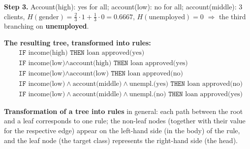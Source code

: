 \documentclass[11pt,a4paper]{article}
\theoremstyle{definition}
\begin{document}
\begin{defbox}
\textbf{Step 3.} Account(high): yes for all; account(low): no for all; account(middle): 3
clients, $H(\text{gender})=\tfrac23\cdot 1+\tfrac13\cdot 0=0.6667$,
$H(\text{unemployed})=0$ $\Rightarrow$ the third branching on \textbf{unemployed}.

\textbf{The resulting tree, transformed into rules:}
\begin{align*}
&\texttt{IF } \text{income(high)} \texttt{ THEN } \text{loan approved(yes)}\\
&\texttt{IF } \text{income(low)}\wedge\text{account(high)} \texttt{ THEN }
   \text{loan approved(yes)}\\
&\texttt{IF } \text{income(low)}\wedge\text{account(low)} \texttt{ THEN }
   \text{loan approved(no)}\\
&\texttt{IF } \text{income(low)}\wedge\text{account(middle)}\wedge\text{unempl.(yes)}
   \texttt{ THEN } \text{loan approved(no)}\\
&\texttt{IF } \text{income(low)}\wedge\text{account(middle)}\wedge\text{unempl.(no)}
   \texttt{ THEN } \text{loan approved(yes)}
\end{align*}
\end{defbox}

\textbf{Transformation of a tree into rules} in general: each path between the root and a leaf
corresponds to one rule; the non-leaf nodes (together with their value for the respective edge)
appear on the left-hand side (in the body) of the rule, and the leaf node (the target class)
represents the right-hand side (the head).
\end{document}
